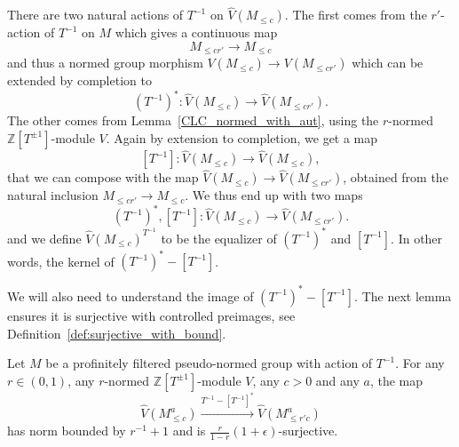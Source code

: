 \begin{definition}
  \label{CLCFPTinv}
  \leanok
  There are two natural actions of $T^{-1}$ on $\hat V(M_{\le c})$.
  The first comes from the $r'$-action of $T^{-1}$ on $M$
  which gives a continuous map
  \[
    M_{\le cr'} \to M_{\le c}
  \]
  and thus a normed group morphism $V(M_{\le c}) \to V(M_{\le cr'})$ which
  can be extended by completion to
  \[
    (T^{-1})^* \colon \hat V(M_{\le c}) \to \hat V(M_{\le cr'}).
  \]
  The other comes from Lemma~\ref{CLC_normed_with_aut},
  using the $r$-normed $\mathbb Z[T^{\pm 1}]$-module $V$.
  Again by extension to completion, we get a map
  \[
    [T^{-1}] \colon \hat V(M_{\le c}) \to \hat V(M_{\le c}),
  \]
  that we can compose with the map
  $\hat V(M_{\le c}) \to \hat V(M_{\le cr'})$,
  obtained from the natural inclusion $M_{\le cr'} \to M_{\le c}$.
  We thus end up with two maps
  \[
    (T^{-1})^*, [T^{-1}] \colon \hat V(M_{\le c}) \to \hat V(M_{\le cr'}).
  \]
  and we define $\hat V(M_{\le c})^{T^{-1}}$
  to be the equalizer of $(T^{-1})^*$ and $[T^{-1}]$.
  In other words, the kernel of $(T^{-1})^* - [T^{-1}]$.
\end{definition}

We will also need to understand the image of $(T^{-1})^* - [T^{-1}]$. The next lemma
ensures it is surjective with controlled preimages, see Definition~\ref{def:surjective_with_bound}.

\begin{lemma}
  \label{lem:Tinv}
  \leanok
  Let $M$ be a profinitely filtered pseudo-normed group with action of $T^{-1}$.
  For any $r ∈ (0, 1)$, any $r$-normed $\mathbb Z[T^{\pm 1}]$-module $V$, any
  $c>0$ and any $a$, the map
  \[
  \widehat{V}(M_{\leq c}^a)\xrightarrow{T^{-1}-[T^{-1}]^\ast} \widehat{V}(M_{\leq r'c}^a)
  \]
  has norm bounded by $r^{-1}+1$ and is $\frac{r}{1-r}(1+\epsilon)$-surjective.
\end{lemma}

